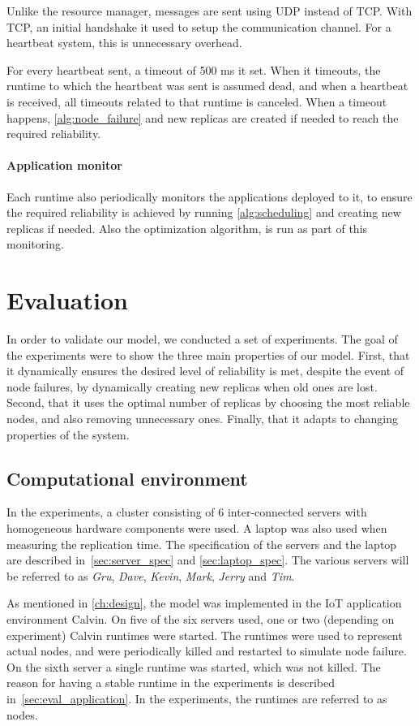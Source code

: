 \documentclass{cslthse-msc}
\begin{document}
Unlike the resource manager, messages are sent using UDP instead of TCP. With TCP, an initial handshake it used to setup the communication channel. For a heartbeat system, this is unnecessary overhead. 

For every heartbeat sent, a timeout of 500 ms it set. When it timeouts, the runtime to which the heartbeat was sent is assumed dead, and when a heartbeat is received, all timeouts related to that runtime is canceled. When a timeout happens, \cref{alg:node_failure} and new replicas are created if needed to reach the required reliability.

\subsubsection{Application monitor}
Each runtime also periodically monitors the applications deployed to it, to ensure the required reliability is achieved by running \cref{alg:scheduling} and creating new replicas if needed. Also the optimization algorithm, is run as part of this monitoring.

\chapter{Evaluation} \label{ch:evaluation}
In order to validate our model, we conducted a set of experiments. The goal of the experiments were to show the three main properties of our model. First, that it dynamically ensures the desired level of reliability is met, despite the event of node failures, by dynamically creating new replicas when old ones are lost. Second, that it uses the optimal number of replicas by choosing the most reliable nodes, and also removing unnecessary ones. Finally, that it adapts to changing properties of the system.

\section{Computational environment} \label{sec:eval_comp_env}
In the experiments, a cluster consisting of 6 inter-connected servers with homogeneous hardware components were used. A laptop was also used when measuring the replication time. The specification of the servers and the laptop are described in~\cref{sec:server_spec} and \cref{sec:laptop_spec}. The various servers will be referred to as \emph{Gru}, \emph{Dave}, \emph{Kevin}, \emph{Mark}, \emph{Jerry} and \emph{Tim}.

As mentioned in \cref{ch:design}, the model was implemented in the IoT application environment Calvin. On five of the six servers used, one or two (depending on experiment) Calvin runtimes were started. The runtimes were used to represent actual nodes, and were periodically killed and restarted to simulate node failure. On the sixth server a single runtime was started, which was not killed. The reason for having a stable runtime in the experiments is described in~\cref{sec:eval_application}. In the experiments, the runtimes are referred to as nodes.
\end{document}
